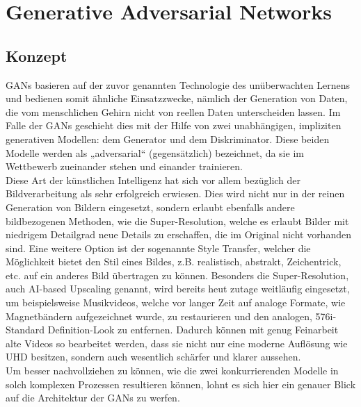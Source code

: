 \chapter{Generative Adversarial Networks}

\section{Konzept}

\noindent \acfp{GAN} basieren auf der zuvor genannten Technologie des unüberwachten Lernens und bedienen somit ähnliche Einsatzzwecke, nämlich der Generation von Daten, die vom menschlichen Gehirn nicht von reellen Daten unterscheiden lassen. Im Falle der \acp{GAN} geschieht dies mit der Hilfe von zwei unabhängigen, impliziten generativen Modellen: dem Generator und dem Diskriminator. Diese beiden Modelle werden als „adversarial“ (gegensätzlich) bezeichnet, da sie im Wettbewerb zueinander stehen und einander trainieren.  \\

\noindent Diese Art der künstlichen Intelligenz hat sich vor allem bezüglich der Bildverarbeitung als sehr erfolgreich erwiesen. Dies wird nicht nur in der reinen Generation von Bildern eingesetzt, sondern erlaubt ebenfalls andere bildbezogenen Methoden, wie die Super-Resolution, welche es erlaubt Bilder mit niedrigem Detailgrad neue Details zu erschaffen, die im Original nicht vorhanden sind. Eine weitere Option ist der sogenannte Style Transfer, welcher die Möglichkeit bietet den Stil eines Bildes, z.B. realistisch, abstrakt, Zeichentrick, etc. auf ein anderes Bild übertragen zu können. Besonders die Super-Resolution, auch AI-based Upscaling genannt, wird bereits heut zutage weitläufig eingesetzt, um beispielsweise Musikvideos, welche vor langer Zeit auf analoge Formate, wie Magnetbändern aufgezeichnet wurde, zu restaurieren und den analogen, 576i-Standard Definition-Look zu entfernen. Dadurch können mit genug Feinarbeit alte Videos so bearbeitet werden, dass sie nicht nur eine moderne Auflösung wie UHD besitzen, sondern auch wesentlich schärfer und klarer aussehen. \\

\noindent Um besser nachvollziehen zu können, wie die zwei konkurrierenden Modelle in solch komplexen Prozessen resultieren können, lohnt es sich hier ein genauer Blick auf die Architektur der \acp{GAN} zu werfen.

\newpage